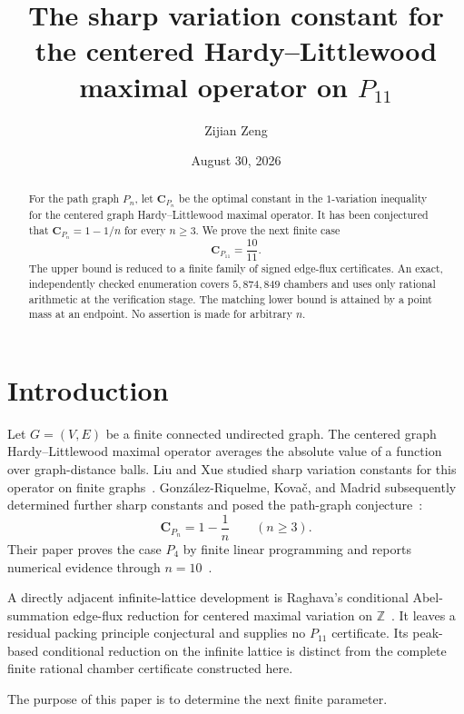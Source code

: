 \documentclass[11pt]{amsart}
\title[The sharp variation constant on $P_{11}$]
{The sharp variation constant for the centered Hardy--Littlewood maximal operator on $P_{11}$}
\author{Zijian Zeng}
\date{August 30, 2026}
\theoremstyle{definition}
\newcommand{\Cpath}[1]{\mathbf C_{P_{#1}}}
\begin{document}
\begin{abstract}
For the path graph $P_n$, let $\mathbf C_{P_n}$ be the optimal constant in
the $1$-variation inequality for the centered graph Hardy--Littlewood maximal
operator.  It has been conjectured that $\mathbf C_{P_n}=1-1/n$ for every
$n\geq3$.  We prove the next finite case
\[
\mathbf C_{P_{11}}=\frac{10}{11}.
\]
The upper bound is reduced to a finite family of signed edge-flux
certificates.  An exact, independently checked enumeration covers
$5{,}874{,}849$ chambers and uses only rational arithmetic at the
verification stage.  The matching lower bound is attained by a point mass at
an endpoint.  No assertion is made for arbitrary $n$.
\end{abstract}

\maketitle

\section{Introduction}

Let $G=(V,E)$ be a finite connected undirected graph.  The centered graph
Hardy--Littlewood maximal operator averages the absolute value of a function
over graph-distance balls.  Liu and Xue studied sharp variation constants for
this operator on finite graphs~\cite{LiuXue2021}.  González-Riquelme, Kovač,
and Madrid subsequently determined further sharp constants and posed the
path-graph conjecture~\cite[Conjecture~5]{GKM2026}:
\begin{equation}\label{eq:path-conjecture}
  \Cpath n=1-\frac1n\qquad(n\geq3).
\end{equation}
Their paper proves the case $P_4$ by finite linear programming and reports
numerical evidence through $n=10$~\cite[Section~3.2 and Conjecture~5]{GKM2026}.

A directly adjacent infinite-lattice development is Raghava's conditional
Abel-summation edge-flux reduction for centered maximal variation on
$\mathbb Z$~\cite[Abstract and Sections~9--10]{Raghava2026}.  It leaves a
residual packing principle conjectural and supplies no $P_{11}$ certificate.
Its peak-based conditional reduction on the infinite lattice is distinct
from the complete finite rational chamber certificate constructed here.

The purpose of this paper is to determine the next finite parameter.
\end{document}
